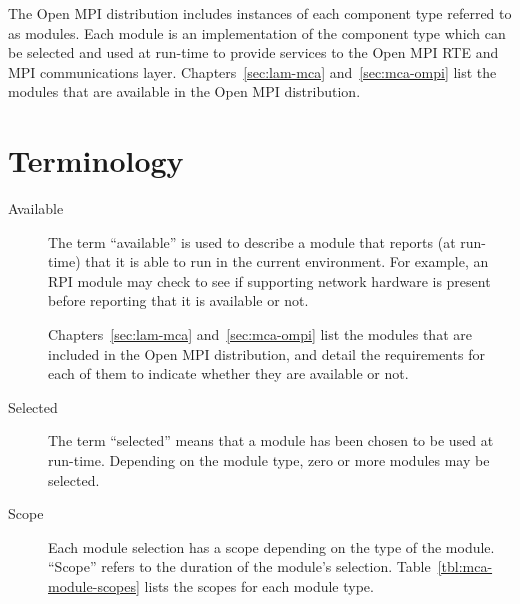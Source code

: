The Open MPI distribution includes instances of each component type
referred to as modules.  Each module is an implementation of the
component type which can be selected and used at run-time to provide
services to the Open MPI RTE and MPI communications layer.
Chapters~\ref{sec:lam-mca} and~\ref{sec:mca-ompi} list the modules that
are available in the Open MPI distribution.


\section{Terminology}

\begin{description}
\item[Available] The term ``available'' is used to describe a module
  that reports (at run-time) that it is able to run in the current
  environment.  For example, an RPI module may check to see if
  supporting network hardware is present before reporting that it is
  available or not.
  
  Chapters~\ref{sec:lam-mca} and~\ref{sec:mca-ompi} list the modules
  that are included in the Open MPI distribution, and detail the
  requirements for each of them to indicate whether they are available
  or not.
  
\item[Selected] The term ``selected'' means that a module has been
  chosen to be used at run-time.  Depending on the module type, zero
  or more modules may be selected.
  
\item[Scope] Each module selection has a scope depending on the type
  of the module.  ``Scope'' refers to the duration of the module's
  selection.  Table~\ref{tbl:mca-module-scopes} lists the scopes for
  each module type.
\end{description}

